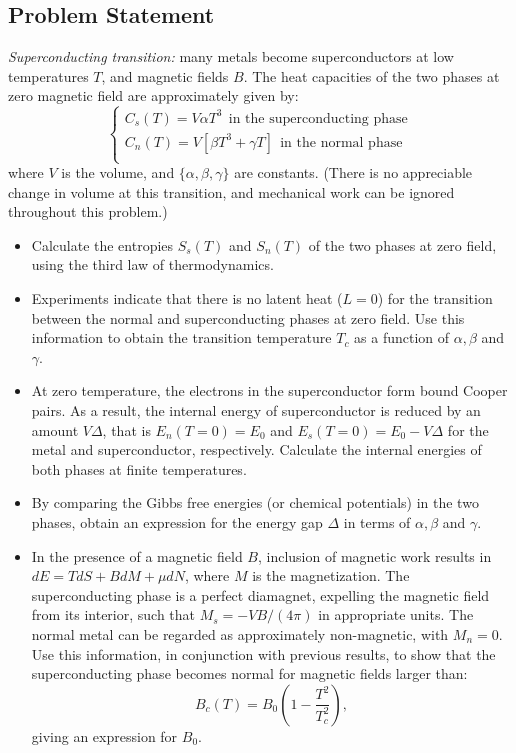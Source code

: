 \documentclass[10pt,twocoloumn]{article}
\begin{document}
\subsection*{Problem Statement}
\textit{Superconducting transition:} many metals become superconductors at low temperatures $T$, and magnetic fields $B$. The heat capacities of the two phases at zero magnetic field are approximately given by:
\begin{equation}
    \begin{cases}
        C_s(T) = V\alpha T^3 \ \ \text{in the superconducting phase}\\
        C_n(T) = V\left[\beta T^3 + \gamma T \right]\ \ \text{in the normal phase}\\
    \end{cases}
\end{equation}
where $V$ is the volume, and $\{\alpha,\beta,\gamma\}$ are constants. (There is no appreciable change in volume at this transition, and mechanical work can be ignored throughout this problem.)
\begin{itemize}
    \item Calculate the entropies $S_s(T)$ and $S_n(T)$ of the two phases at zero field, using the third law of thermodynamics.
    \item Experiments indicate that there is no latent heat ($L=0$) for the transition between the normal and superconducting phases at zero field. Use this information to obtain the transition temperature $T_c$ as a function of $\alpha, \beta$ and $\gamma$.
    \item At zero temperature, the electrons in the superconductor form bound Cooper pairs. As a result, the internal energy of superconductor is reduced by an amount $V\Delta$, that is $E_n(T=0)=E_0$ and $E_s(T=0)=E_0 -V \Delta$ for the metal and superconductor, respectively. Calculate the internal energies of both phases at finite temperatures.
    \item By comparing the Gibbs free energies (or chemical potentials) in the two phases, obtain an expression for the energy gap $\Delta$ in terms of $\alpha, \beta$ and $\gamma$.
    \item In the presence of a magnetic field $B$, inclusion of magnetic work results in $dE = TdS + BdM + \mu dN$, where $M$ is the magnetization. The superconducting phase is a perfect diamagnet, expelling the magnetic field from its interior, such that $M_s = -VB/(4\pi)$ in appropriate units. The normal metal can be regarded as approximately non-magnetic, with $M_n=0$. Use this information, in conjunction with previous results, to show that the superconducting phase becomes normal for magnetic fields larger than:
    \begin{equation}
        B_c(T) = B_0\left(1- \frac{T^2}{T_c^2}\right),
    \end{equation}
    giving an expression for $B_0$.
\end{itemize}
\end{document}
